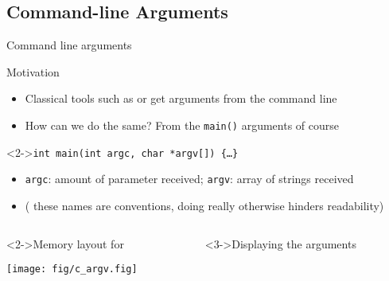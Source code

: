 \begin{Coupe}
\subsection{Command-line Arguments}\subtoc
\begin{frame}{Command line arguments}
  \begin{block}{Motivation}
    \begin{itemize}
    \item Classical tools such as  or  get arguments from the
      command line
    \item How can we do the same? From the \texttt{main()} arguments of course
    \end{itemize}
  \end{block}
  \begin{block}<2->{\texttt{int main(int argc, char *argv[]) \{\ldots\}}}
    \begin{itemize}\vspace{-.5\baselineskip}
    \item \alert{\texttt{argc}}: amount of parameter received;
      \alert{\texttt{argv}}: array of strings received
    \item ( these names are conventions, doing really otherwise hinders
      readability)
    \end{itemize}
  \end{block}
  \begin{columns}
    \begin{column}{.45\linewidth}
      \begin{block}<2->{Memory layout for }\medskip
        \centerline{\texttt{[image: fig/c\_argv.fig]}}    
      \end{block}      
    \end{column}
    \begin{column}{.5\linewidth}
      \begin{block}<3->{Displaying the arguments}\smallskip
      \end{block}      
    \end{column}
  \end{columns}
\end{frame}

\end{Coupe}
